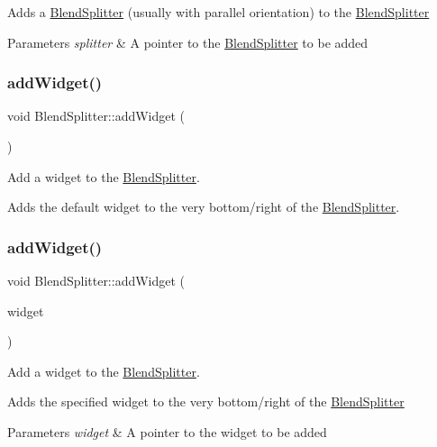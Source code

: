 Adds a \hyperlink{class_blend_splitter}{Blend\+Splitter} (usually with parallel orientation) to the \hyperlink{class_blend_splitter}{Blend\+Splitter} 
\begin{DoxyParams}{Parameters}
{\em splitter} & A pointer to the \hyperlink{class_blend_splitter}{Blend\+Splitter} to be added \\
\hline
\end{DoxyParams}
\hypertarget{class_blend_splitter_a9bb010ba4ee756ca4d718acadaffb7cc}{}\label{class_blend_splitter_a9bb010ba4ee756ca4d718acadaffb7cc} 
\subsubsection{\texorpdfstring{add\+Widget()}{addWidget()}\hspace{0.1cm}{\footnotesize\ttfamily [1/3]}}
{\footnotesize\ttfamily void Blend\+Splitter\+::add\+Widget (\begin{DoxyParamCaption}{ }\end{DoxyParamCaption})}



Add a widget to the \hyperlink{class_blend_splitter}{Blend\+Splitter}. 

Adds the default widget to the very bottom/right of the \hyperlink{class_blend_splitter}{Blend\+Splitter}. \hypertarget{class_blend_splitter_a305c3aee946a9fb9dcd95fdc72faff8b}{}\label{class_blend_splitter_a305c3aee946a9fb9dcd95fdc72faff8b} 
\subsubsection{\texorpdfstring{add\+Widget()}{addWidget()}\hspace{0.1cm}{\footnotesize\ttfamily [2/3]}}
{\footnotesize\ttfamily void Blend\+Splitter\+::add\+Widget (\begin{DoxyParamCaption}\item[{Q\+Widget $\ast$}]{widget }\end{DoxyParamCaption})}



Add a widget to the \hyperlink{class_blend_splitter}{Blend\+Splitter}. 

Adds the specified widget to the very bottom/right of the \hyperlink{class_blend_splitter}{Blend\+Splitter} 
\begin{DoxyParams}{Parameters}
{\em widget} & A pointer to the widget to be added \\
\hline
\end{DoxyParams}
\hypertarget{class_blend_splitter_a9ea589322d7bbb3e5530ad79df18a525}{}\label{class_blend_splitter_a9ea589322d7bbb3e5530ad79df18a525} 
